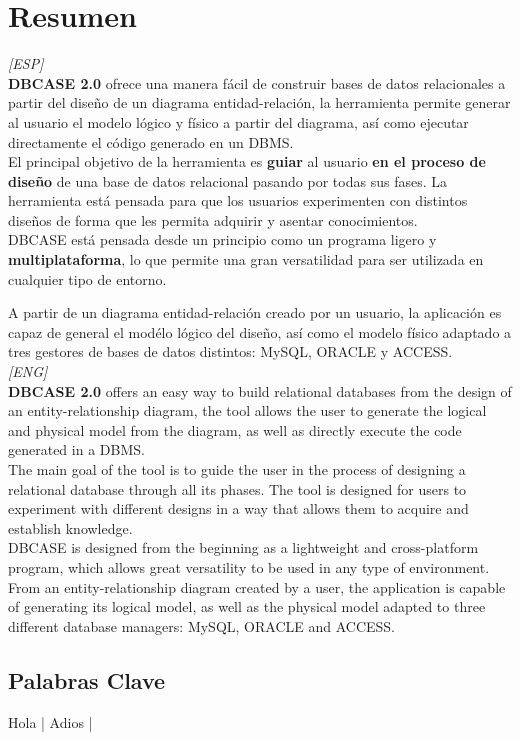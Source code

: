 \chapter*{Resumen}%
\textit{[ESP]}\\

\textbf{DBCASE 2.0} ofrece una manera fácil de construir bases de datos relacionales a partir del diseño de un diagrama entidad-relación, la herramienta permite generar al usuario el modelo lógico y físico a partir del diagrama, así como ejecutar directamente el código generado en un DBMS.\\

El principal objetivo de la herramienta es \textbf{guiar} al usuario \textbf{en el proceso de diseño} de una base de datos relacional pasando por todas sus fases. La herramienta está pensada para que los usuarios experimenten con distintos diseños de forma que les permita adquirir y asentar conocimientos.\\

DBCASE está pensada desde un principio como un programa ligero y \textbf{multiplataforma}, lo que permite una gran versatilidad para ser utilizada en cualquier tipo de entorno.

A partir de un diagrama entidad-relación creado por un usuario, la aplicación es capaz de general el modélo lógico del diseño, así como el modelo físico adaptado a tres gestores de bases de datos distintos: MySQL, ORACLE y ACCESS.\\

\textit{[ENG]}\\

\textbf{DBCASE 2.0} offers an easy way to build relational databases from the design of an entity-relationship diagram, the tool allows the user to generate the logical and physical model from the diagram, as well as directly execute the code generated in a DBMS.\\

The main goal of the tool is to guide the user in the process of designing a relational database through all its phases. The tool is designed for users to experiment with different designs in a way that allows them to acquire and establish knowledge.\\

DBCASE is designed from the beginning as a lightweight and cross-platform program, which allows great versatility to be used in any type of environment.\\

From an entity-relationship diagram created by a user, the application is capable of generating its logical model, as well as the physical model adapted to three different database managers: MySQL, ORACLE and ACCESS.
\section*{Palabras Clave}
Hola | Adios | 